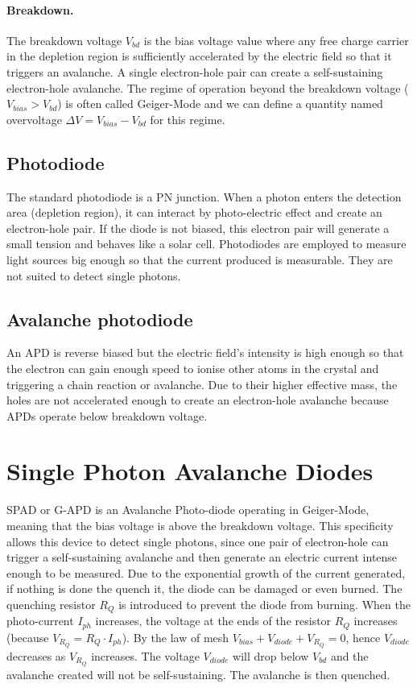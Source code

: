\paragraph{Breakdown.} 
The breakdown voltage $V_{bd}$ is the bias voltage value where any free charge carrier in the depletion region is sufficiently accelerated by the electric field so that it triggers an avalanche. A single electron-hole pair can create a self-sustaining electron-hole avalanche. The regime of operation beyond the breakdown voltage ($V_{bias} > V_{bd}$) is often called Geiger-Mode and we can define a quantity named overvoltage $\Delta V = V_{bias}-V_{bd}$ for this regime.


\subsection{Photodiode}
\label{ch:2:subsec:Photodiode}
The standard photodiode is a PN junction. When a photon enters the detection area (depletion region), it can interact by photo-electric effect and create an electron-hole pair. If the diode is not biased, this electron pair will generate a small tension and behaves like a solar cell. Photodiodes are employed to measure light sources big enough so that the current produced is measurable. They are not suited to detect single photons. 

\subsection{Avalanche photodiode}
\label{ch:2:subsec:Avalanche photodiode}
An \ac{APD} is reverse biased but the electric field's intensity is high enough so that the electron can gain enough speed to ionise other atoms in the crystal and triggering a chain reaction or avalanche. Due to their higher effective mass, the holes are not accelerated enough to create an electron-hole avalanche because APDs operate below breakdown voltage. 

\section{Single Photon Avalanche Diodes}
\label{sec:background:Basic principles:SPADs}
\ac{SPAD} or \ac{G-APD} is an Avalanche Photo-diode operating in Geiger-Mode, meaning that the bias voltage is above the breakdown voltage. This specificity allows this device to detect single photons, since one pair of electron-hole can trigger a self-sustaining avalanche and then generate an electric current intense enough to be measured. Due to the exponential growth of the current generated, if nothing is done the quench it, the diode can be damaged or even burned. The quenching resistor $R_Q$ is introduced to prevent the diode from burning. When the photo-current $I_{ph}$ increases, the voltage at the ends of the resistor $R_Q$ increases (because $V_{R_Q}= R_Q\cdot I_{ph}$). By the law of mesh $V_{bias} + V_{diode}+ V_{R_Q} = 0$, hence $V_{diode}$ decreases as $V_{R_Q}$ increases. The voltage $V_{diode}$ will drop below $V_{bd}$ and the avalanche created will not be self-sustaining. The avalanche is then quenched.

